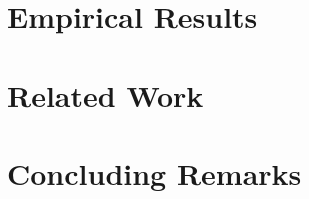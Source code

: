 \documentclass{article}
\begin{document}
\section{Empirical Results}



\section{Related Work}



\section{Concluding Remarks}







\end{document}
